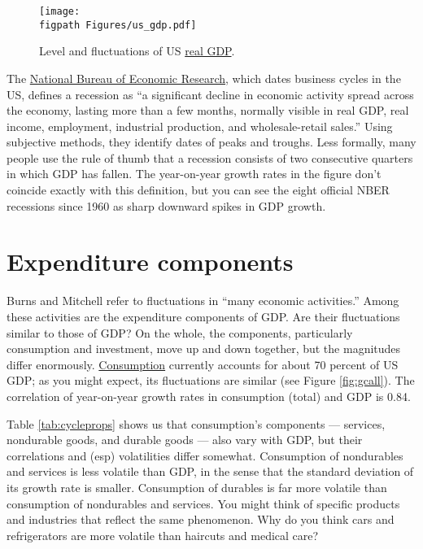 \begin{figure}[h]
 \caption{Level and fluctuations of US \href{http://research.stlouisfed.org/fred2/series/GDPC1?cid=106}{real GDP}.}
    \label{fig:yandgy}
    \centering
    \texttt{[image: \\figpath Figures/us\_gdp.pdf]}
\end{figure}

The \href{http://www.nber.org/cycles/main.html}{National Bureau of Economic Research},
which dates business cycles in the US,
defines a recession  as ``a significant decline
in economic activity spread across the economy,
lasting more than a few months, normally visible in real GDP,
real income, employment, industrial production,
and wholesale-retail sales.''
Using subjective methods, they identify dates of peaks and troughs.
Less formally, many people use the rule of thumb
that a recession consists of two consecutive quarters
in which GDP has fallen.
The year-on-year growth rates in the figure don't coincide exactly
with this definition, but you can see the eight official NBER
recessions since 1960 as sharp downward spikes in GDP growth.


\section{Expenditure components}

Burns and Mitchell refer to fluctuations in
``many economic activities.''
Among these activities are the expenditure
components of GDP.
Are their fluctuations similar to those of GDP?
On the whole, the components, particularly consumption and investment,
move up and down together, but the magnitudes differ enormously.
\href{http://research.stlouisfed.org/fred2/series/PCECC96?cid=110}{Consumption}
currently accounts for about 70 percent of US GDP;
as you might expect, its fluctuations are similar (see Figure \ref{fig:gcall}).
The correlation of year-on-year growth rates in consumption (total)
and GDP is 0.84.

Table \ref{tab:cycleprops} shows us that consumption's components ---
services, nondurable goods, and durable goods --- also vary with GDP,
but their correlations and (esp) volatilities differ somewhat.
Consumption of nondurables and services
is less volatile than GDP, in the sense that
the standard deviation of its growth rate is smaller.
Consumption of durables is far more
volatile %
than consumption of nondurables and services.
You might think of specific products and industries that reflect
the same phenomenon.
Why do you think cars and refrigerators
are more volatile than haircuts and medical care?

